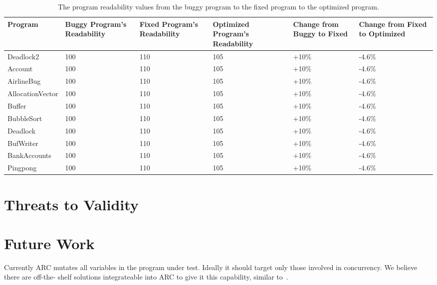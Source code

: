 \documentclass[10pt, conference, compsocconf]{IEEEtran}
\begin{document}
\begin{table}[!t]
\begin{center}
\begin{tabular}{|l|p{2cm}|p{2cm}|p{2cm}|p{2cm}|p{2cm}|}
\hline
\textbf{Program} &
\textbf{Buggy Program's Readability} &
\textbf{Fixed Program's Readability} &
\textbf{Optimized Program's Readability} &
\textbf{Change from Buggy to Fixed} &
\textbf{Change from Fixed to Optimized}
\\\hline
Deadlock2 & 100 & 110 & 105 & +10\% & -4.6\%
\\\hline
Account & 100 & 110 & 105 & +10\% & -4.6\%
\\\hline
AirlineBug & 100 & 110 & 105 & +10\% & -4.6\%
\\\hline
AllocationVector & 100 & 110 & 105 & +10\% & -4.6\%
\\\hline
Buffer & 100 & 110 & 105 & +10\% & -4.6\%
\\\hline
BubbleSort & 100 & 110 & 105 & +10\% & -4.6\%
\\\hline
Deadlock & 100 & 110 & 105 & +10\% & -4.6\%
\\\hline
BufWriter & 100 & 110 & 105 & +10\% & -4.6\%
\\\hline
BankAccounts & 100 & 110 & 105 & +10\% & -4.6\%
\\\hline
Pingpong & 100 & 110 & 105 & +10\% & -4.6\%
\\\hline
\end{tabular}
\caption{The program readability values from the buggy program to the fixed program to the optimized program.}
\label{tbl:readability}
\end{center}
\end{table}

\section{Threats to Validity}
\label{sec:threats}



\section{Future Work}
\label{sec:future_work}

Currently ARC mutates all variables in the program under test. Ideally it
should target only those involved in concurrency. We believe there are off-the-
shelf solutions integrateable into ARC to give it this capability, similar
to~\cite{CM08, HP00}.
\end{document}
